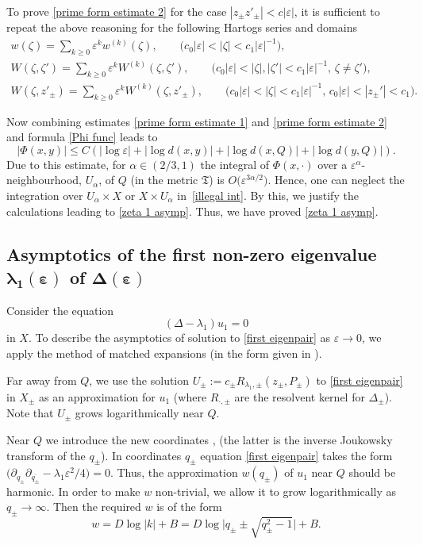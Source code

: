 \documentclass[pdftex]{sigma}
\numberwithin{equation}{section}
\theoremstyle{definition}
\begin{document}
To prove \eqref{prime form estimate 2} for the case $|z_\pm z'_\pm|< c|\varepsilon|$, it is sufficient to repeat the above reasoning for the following Hartogs series and domains
\begin{gather*}
w(\zeta)=\sum_{k\ge 0}\varepsilon^k w^{(k)}(\zeta), \qquad \bigl(c_0|\varepsilon|<|\zeta|<c_1|\varepsilon|^{-1}\bigr),\\
W(\zeta,\zeta')=\sum_{k\ge 0}\varepsilon^{k} W^{(k)}(\zeta,\zeta'),\qquad \bigl(c_0|\varepsilon|<|\zeta|, |\zeta'|<c_1|\varepsilon|^{-1},\, \zeta\ne\zeta'\bigr),\\
W(\zeta,z'_\pm)=\sum_{k\ge 0}\varepsilon^{k} W^{(k)}(\zeta,z'_\pm), \qquad \bigl(c_0|\varepsilon|<|\zeta|<c_1|\varepsilon|^{-1},\, c_0|\varepsilon|<|z_\pm'|<c_1\bigr).
\end{gather*}

Now combining estimates \eqref{prime form estimate 1} and \eqref{prime form estimate 2} and formula \eqref{Phi func} leads to
\[|\Phi(x,y)|\le C\left(|\log \varepsilon|+|\log d(x,y)|+|\log d(x,Q)|+|\log d(y,Q)|\right).\]
Due to this estimate, for $\alpha\in (2/3,1)$ the integral of $\Phi(x,\cdot)$ over a $\varepsilon^{\alpha}$-neighbourhood, $U_\alpha$, of $Q$ (in the metric $\mathfrak{T}$) is $O\bigl(\varepsilon^{3\alpha/2}\bigr)$. Hence, one can neglect the integration over $U_\alpha\times X$ or $X\times U_\alpha$ in~\eqref{illegal int}. By this, we justify the calculations leading to \eqref{zeta 1 asymp}. Thus, we have proved \eqref{zeta 1 asymp}.

\subsection*{Asymptotics of the first non-zero eigenvalue $\boldsymbol{\lambda_1(\varepsilon)}$ of $\boldsymbol{\Delta(\varepsilon)}$} Consider the equation
\begin{equation}
\label{first eigenpair}
(\Delta-\lambda_1)u_1=0
\end{equation}
in $X$. To describe the asymptotics of solution to \eqref{first eigenpair} as $\varepsilon\to 0$, we apply the method of matched expansions (in the form given in \cite[Chapter 6]{MNP}).

Far away from $Q$, we use the solution $U_\pm:=c_\pm R_{\lambda_1,\pm}(z_\pm,P_\pm)$ to \eqref{first eigenpair} in $X_\pm$ as an approximation for $u_1$ (where $R_{\cdot,\pm}$ are the resolvent kernel for $\Delta_\pm$). Note that $U_\pm$ grows logarithmically near $Q$.

Near $Q$ we introduce the new coordinates
, 
(the latter is the inverse Joukowsky transform of the $q_\pm$). In coordinates $q_\pm$ equation \eqref{first eigenpair} takes the form~${\bigl(\partial_{q_\pm}\partial_{\overline{q_{\pm}}}-\lambda_1\varepsilon^{2}/4\bigr)=0}$.
Thus, the approximation $w(q_\pm)$ of $u_1$ near $Q$ should be harmonic. In order to make $w$ non-trivial, we allow it to grow logarithmically as $q_\pm\to\infty$. Then the required $w$ is of the form
\[w=D\log |k|+B=D\log \big|q_\pm\pm\sqrt{q_\pm^2-1}\big|+B.\]
\end{document}
